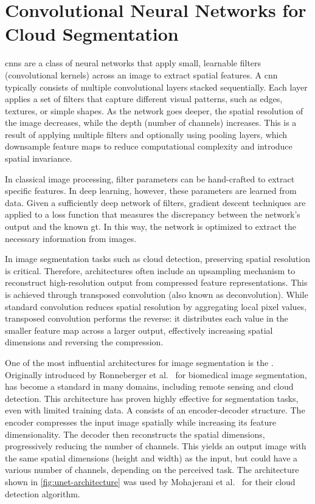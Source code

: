 {\clearpage
\section{Convolutional Neural Networks for Cloud Segmentation}
\label{subsec:stateoftheart}

\glspl{cnn} are a class of neural networks that apply small, learnable filters (convolutional kernels)
across an image to extract spatial features. A \gls{cnn} typically consists of multiple convolutional layers stacked sequentially.
Each layer applies a set of filters that capture different visual patterns, such as edges, textures, or simple shapes.
As the network goes deeper, the spatial resolution of the image decreases, while the depth (number of channels) increases.
This is a result of applying multiple filters and optionally using pooling layers,
which downsample feature maps to reduce computational complexity and introduce spatial invariance.

In classical image processing, filter parameters can be hand-crafted to extract specific features. %
In deep learning, however, these parameters are learned from data.
Given a sufficiently deep network of filters, gradient descent techniques are applied to a loss function
that measures the discrepancy between the network's output and the known \gls{gt}.
In this way, the network is optimized to extract the necessary information from images.

In image segmentation tasks such as cloud detection, preserving spatial resolution is critical.
Therefore, architectures often include an upsampling mechanism to reconstruct high-resolution output from compressed feature representations.
This is achieved through transposed convolution (also known as deconvolution).
While standard convolution reduces spatial resolution by aggregating local pixel values, transposed convolution performs the reverse:
it distributes each value in the smaller feature map across a larger output, effectively increasing spatial dimensions and reversing the compression.

One of the most influential architectures for image segmentation is the .
Originally introduced by Ronneberger et al.~\cite{ronneberger2015u} for biomedical image segmentation,
 has become a standard in many domains, including remote sensing and cloud detection.
This architecture has proven highly effective for segmentation tasks, even with limited training data.
A  consists of an encoder-decoder structure.
The encoder compresses the input image spatially while increasing its feature dimensionality.
The decoder then reconstructs the spatial dimensions, progressively reducing the number of channels.
This yields an output image with the same spatial dimensions (height and width) as the input, but could have a various number of channels, depending on the perceived task.
The  architecture shown in \autoref{fig:unet-architecture} was used by Mohajerani et al.~\cite{CloudNet2019} for their cloud detection algorithm.

}
